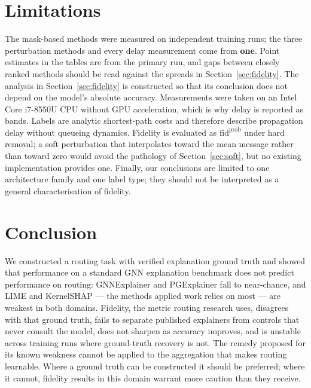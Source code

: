\documentclass[conference]{IEEEtran}
\begin{document}
\section{Limitations}
\label{sec:limits}
The \SeedNMethodsWord{} mask-based methods were measured on \SeedNWord{}
independent training runs; the three perturbation methods and every delay measurement come
from \textbf{one}. Point estimates in the tables are from the primary run, and
gaps between closely ranked methods should be read against the spreads in
Section~\ref{sec:fidelity}. The analysis
in Section~\ref{sec:fidelity} is constructed so that its conclusion does not
depend on the model's absolute accuracy. Measurements were
taken on an Intel Core i7-8550U CPU without GPU acceleration, which is why
delay is reported as bands. Labels are analytic shortest-path costs and
therefore describe propagation delay without queueing dynamics. Fidelity is
evaluated as $\mathrm{fid}^{\mathrm{prob}}$ under hard removal; a soft
perturbation that interpolates toward the mean message rather than toward zero
would avoid the pathology of Section~\ref{sec:soft}, but no existing
implementation provides one. Finally, our conclusions are limited to one architecture family and one label type; they should not be interpreted as a general characterisation of fidelity.

\section{Conclusion}
We constructed a routing task with verified explanation ground truth and showed that performance on a standard GNN explanation benchmark does not predict performance on routing: GNNExplainer and PGExplainer fall to near-chance, and
LIME and KernelSHAP --- the methods applied work relies on most --- are weakest
in both domains. Fidelity, the metric routing research uses, disagrees with that ground truth,
fails to separate published explainers from controls that never consult the
model, does not sharpen as accuracy improves, and is unstable across training
runs where ground-truth recovery is not. The remedy proposed for its known
weakness cannot be applied to the aggregation that makes routing learnable.
Where a ground truth can be constructed it should be preferred; where it
cannot, fidelity results in this domain warrant more caution than they
receive.



\end{document}
